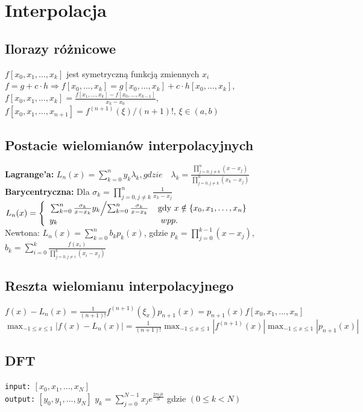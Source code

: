 \documentclass[a4paper,twocolumn]{article}
\begin{document}
\section{Interpolacja}
\subsection{Ilorazy różnicowe}
$f[x_0,x_1, \ldots, x_k]$ jest symetryczną funkcją zmiennych $x_i$\\ $f = g+c\cdot h \Rightarrow f[x_0,\ldots,x_k]=g[x_0,\ldots,x_k]+c\cdot h[x_0,\ldots,x_k]$,\\ $f[x_0, x_1,\ldots,x_k] = \frac{f[x_1,\ldots,x_k]-f[x_0,\ldots,x_{k-1}]}{x_k-x_0}$,\\
$f[x_0,x_1,\ldots,x_{n+1}] = f^{(n+1)}(\xi) / (n+1)!$, $\xi \in (a,b)$

\subsection{Postacie wielomianów interpolacyjnych}
\textbf{Lagrange'a:} $L_n(x) =\sum_{k=0}^ny_k
\lambda_k ,gdzie\quad \lambda_k=\frac{\prod_{j=0, j\neq k}^{n}(x-x_j)}{\prod_{j=0, j\neq k}^{n}(x_k-x_j)}$\\
\textbf{Barycentryczna:}
Dla $\sigma_k = \prod^n_{j=0, j\neq k}\frac{1}{x_k-x_j}$\\
$  L_n(x) = \left\{ \begin{array}{ll}
\left. \sum_{k=0}^n\frac{\sigma_k}{x-x_k}y_k \middle/ \sum_{k=0}^n\frac{\sigma_k}{x-x_k} \right. & \textrm{gdy $x \notin \left\{ x_0,x_1,\dots,x_n \right\} $}\\
y_k & \textrm{ $ wpp. $}
\end{array} \right.
$\\
Newtona: 
$ L_n(x) = \sum_{k=0}^n b_kp_k(x)$, gdzie $p_k = \prod_{j = 0}^{k-1} (x - x_j)$, \\
$b_k = \sum_{i = 0}^k \frac{f(x_i)}{\prod_{j = 0, j\neq i}^k (x_i - x_j)}$

\subsection{Reszta wielomianu interpolacyjnego}
$f(x)-L_n(x) = \frac{1}{(n+1)!}f^{(n+1)}(\xi_x)p_{n+1}(x) = p_{n+1}(x)f[x_0, x_1, ..., x_n]$\\
$\max_{-1\leq x \leq 1} | f(x)-L_n(x) | = \frac{1}{(n+1)!}\max_{-1\leq x \leq 1} | f^{(n+1)}(x) | \max_{-1\leq x \leq 1} | p_{n+1}(x) |$
\subsection{DFT}
\texttt{input:} $[x_0, x_1, ..., x_N]$\\
\texttt{output:} $[y_0, y_1, ..., y_N]$
$y_k = \sum_{j = 0}^{N-1} x_j e^{\frac{2 \pi i j k}{N}} $ gdzie $ (0 \leqslant k < N)$
\end{document}
